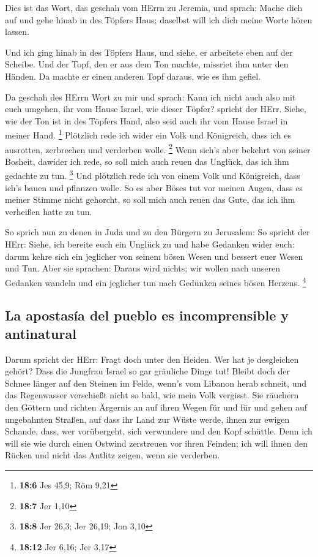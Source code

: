  Dies ist das Wort, das geschah vom HErrn zu Jeremia, und
sprach:  Mache dich auf und gehe hinab in des Töpfers
Haus; daselbst will ich dich meine Worte hören lassen.

 Und ich ging hinab in des Töpfers Haus, und siehe, er
arbeitete eben auf der Scheibe.  Und der Topf, den er aus
dem Ton machte, missriet ihm unter den Händen. Da machte er einen
anderen Topf daraus, wie es ihm gefiel.

 Da geschah des HErrn Wort zu mir und sprach:
 Kann ich nicht auch also mit euch umgehen, ihr vom Hause
Israel, wie dieser Töpfer? spricht der HErr. Siehe, wie der Ton ist in
des Töpfers Hand, also seid auch ihr vom Hause Israel in meiner Hand.
\footnote{\textbf{18:6} Jes 45,9; Röm 9,21}  Plötzlich
rede ich wider ein Volk und Königreich, dass ich es ausrotten,
zerbrechen und verderben wolle. \footnote{\textbf{18:7} Jer 1,10}
 Wenn sich's aber bekehrt von seiner Bosheit, dawider ich
rede, so soll mich auch reuen das Unglück, das ich ihm gedachte zu tun.
\footnote{\textbf{18:8} Jer 26,3; Jer 26,19; Jon 3,10} 
Und plötzlich rede ich von einem Volk und Königreich, dass ich's bauen
und pflanzen wolle.  So es aber Böses tut vor meinen
Augen, dass es meiner Stimme nicht gehorcht, so soll mich auch reuen das
Gute, das ich ihm verheißen hatte zu tun.

 So sprich nun zu denen in Juda und zu den Bürgern zu
Jerusalem: So spricht der HErr: Siehe, ich bereite euch ein Unglück zu
und habe Gedanken wider euch: darum kehre sich ein jeglicher von seinem
bösen Wesen und bessert euer Wesen und Tun.  Aber sie
sprachen: Daraus wird nichts; wir wollen nach unseren Gedanken wandeln
und ein jeglicher tun nach Gedünken seines bösen Herzens. \footnote{\textbf{18:12}
  Jer 6,16; Jer 3,17}

\hypertarget{la-apostasuxeda-del-pueblo-es-incomprensible-y-antinatural}{%
\subsection{La apostasía del pueblo es incomprensible y
antinatural}\label{la-apostasuxeda-del-pueblo-es-incomprensible-y-antinatural}}

 Darum spricht der HErr: Fragt doch unter den Heiden. Wer
hat je desgleichen gehört? Dass die Jungfrau Israel so gar gräuliche
Dinge tut!  Bleibt doch der Schnee länger auf den Steinen
im Felde, wenn's vom Libanon herab schneit, und das Regenwasser
verschießt nicht so bald, wie mein Volk vergisst.  Sie
räuchern den Göttern und richten Ärgernis an auf ihren Wegen für und für
und gehen auf ungebahnten Straßen,  auf dass ihr Land zur
Wüste werde, ihnen zur ewigen Schande, dass, wer vorübergeht, sich
verwundere und den Kopf schüttle.  Denn ich will sie wie
durch einen Ostwind zerstreuen vor ihren Feinden; ich will ihnen den
Rücken und nicht das Antlitz zeigen, wenn sie verderben.

